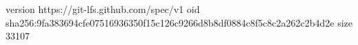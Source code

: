 version https://git-lfs.github.com/spec/v1
oid sha256:9fa383694cfe07516936350f15c126c9266d8b8df0884c8f5c8c2a262c2b4d2e
size 33107
